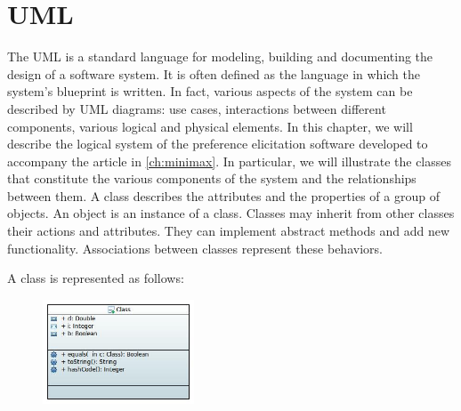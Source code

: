 \section{UML}

The \ac{UML} is a standard language for modeling, building and documenting the design of a software system. It is often defined as the language in which the system's blueprint is written. In fact, various aspects of the system can be described by UML diagrams: use cases, interactions between different components, various logical and physical elements.
In this chapter, we will describe the logical system of the preference elicitation software developed to accompany the article in \cref{ch:minimax}.
In particular, we will illustrate the classes that constitute the various components of the system and the relationships between them.
A class describes the attributes and the properties of a group of objects. An object is an instance of a class.
Classes may inherit from other classes their actions and attributes. They can implement abstract methods and add new functionality. Associations between classes represent these behaviors.

A class is represented as follows:

\begin{figure}[h]
	\centering
	\includegraphics[width=0.4\textwidth]{uml/example.jpeg}
	\label{uml:example}
\end{figure}


